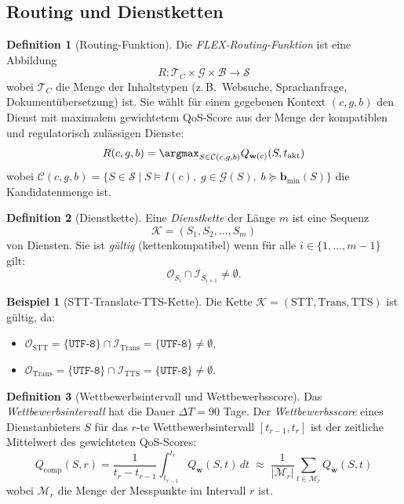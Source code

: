 ﻿\documentclass[a4paper,12pt]{article}
\theoremstyle{definition}
\newtheorem{definition}{Definition}
\newtheorem{beispiel}{Beispiel}
\begin{document}
\subsection{Routing und Dienstketten}

\begin{definition}[Routing-Funktion]
\label{def:routing}
Die \emph{FLEX-Routing-Funktion} ist eine Abbildung
\[
    R: \mathcal{T}_C \times \mathcal{G} \times \mathcal{B} \to \mathcal{S}
\]
wobei $\mathcal{T}_C$ die Menge der Inhaltstypen (z.\,B.\ Websuche, Sprachanfrage, Dokumentübersetzung) ist. Sie wählt für einen gegebenen Kontext $(c, g, b)$ den Dienst mit maximalem gewichtetem QoS-Score aus der Menge der kompatiblen und regulatorisch zulässigen Dienste:
\[
    R(c, g, b) = \argmax_{S \in \mathcal{C}(c,g,b)} Q_{\mathbf{w}(c)}(S, t_{\mathrm{akt}})
\]
wobei $\mathcal{C}(c,g,b) = \{S \in \mathcal{S} \mid S \models I(c),\; g \in \mathcal{G}(S),\; b \succeq \mathbf{b}_{\min}(S)\}$ die Kandidatenmenge ist.
\end{definition}

\begin{definition}[Dienstkette]
\label{def:kette}
Eine \emph{Dienstkette} der Länge $m$ ist eine Sequenz
\[
    \mathcal{K} = (S_1, S_2, \ldots, S_m)
\]
von Diensten. Sie ist \emph{gültig} (kettenkompatibel) wenn für alle $i \in \{1, \ldots, m-1\}$ gilt:
\[
    \mathcal{O}_{S_i} \cap \mathcal{I}_{S_{i+1}} \neq \emptyset.
\]
\end{definition}

\begin{beispiel}[STT-Translate-TTS-Kette]
Die Kette $\mathcal{K} = (\mathrm{STT}, \mathrm{Trans}, \mathrm{TTS})$ ist gültig, da:
\begin{itemize}
    \item $\mathcal{O}_\mathrm{STT} = \{\texttt{UTF-8}\} \cap \mathcal{I}_\mathrm{Trans} = \{\texttt{UTF-8}\} \neq \emptyset$,
    \item $\mathcal{O}_\mathrm{Trans} = \{\texttt{UTF-8}\} \cap \mathcal{I}_\mathrm{TTS} = \{\texttt{UTF-8}\} \neq \emptyset$.
\end{itemize}
\end{beispiel}

\begin{definition}[Wettbewerbsintervall und Wettbewerbsscore]
\label{def:wettbewerb}
Das \emph{Wettbewerbsintervall} hat die Dauer $\Delta T = 90$ Tage. Der \emph{Wettbewerbsscore} eines Dienstanbieters $S$ für das $r$-te Wettbewerbsintervall $[t_{r-1}, t_r]$ ist der zeitliche Mittelwert des gewichteten QoS-Scores:
\[
    Q_{\mathrm{comp}}(S, r) = \frac{1}{t_r - t_{r-1}} \int_{t_{r-1}}^{t_r} Q_{\mathbf{w}}(S, t)\, dt
    \;\approx\; \frac{1}{|\mathcal{M}_r|} \sum_{t \in \mathcal{M}_r} Q_{\mathbf{w}}(S, t)
\]
wobei $\mathcal{M}_r$ die Menge der Messpunkte im Intervall $r$ ist.
\end{definition}
\end{document}

